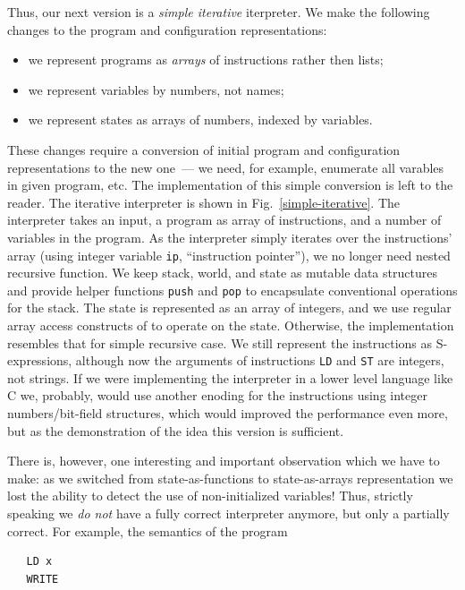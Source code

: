 Thus, our next version is a \emph{simple iterative} iterpreter. We make the following changes to the program and configuration
representations:

\begin{itemize}
\item we represent programs as \emph{arrays} of instructions rather then lists;
\item we represent variables by numbers, not names;
\item we represent states as arrays of numbers, indexed by variables.
\end{itemize}

These changes require a conversion of initial program and configuration representations to the new one~--- we need, for example, enumerate
all varables in given program, etc. The implementation of this simple conversion is left to the reader. The iterative interpreter
is shown in Fig.~\ref{simple-iterative}. The interpreter takes an input, a program as array of instructions, and a number of
variables in the program. As the interpreter simply iterates over the instructions' array (using integer variable \lstinline|ip|, ``instruction pointer''),
we no longer need nested recursive function. We keep stack, world, and state as mutable data structures and provide helper functions
\lstinline|push| and \lstinline|pop| to encapsulate conventional operations for the stack. The state is represented as an array of
integers, and we use regular array access constructs of \lama to operate on the state. Otherwise, the implementation resembles that for
simple recursive case. We still represent the instructions as S-expressions, although now the arguments of instructions \texttt{LD} and \texttt{ST}
are integers, not strings. If we were implementing the interpreter in a lower level language like \textsc{C} we, probably, would use
another enoding for the instructions using integer numbers/bit-field structures, which would improved the performance even more, but as the
demonstration of the idea this version is sufficient.

There is, however, one interesting and important observation which we have to make: as we switched from state-as-functions to state-as-arrays
representation we lost the ability to detect the use of non-initialized variables! Thus, strictly speaking we \emph{do not}
have a fully correct interpreter anymore, but only a partially correct. For example, the semantics of the program

\begin{lstlisting}
   LD x
   WRITE
\end{lstlisting}

